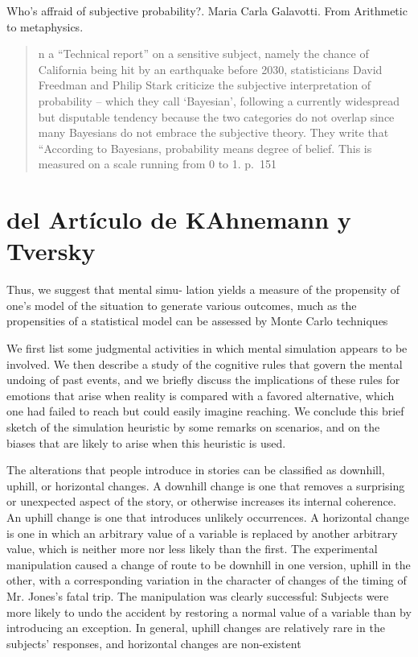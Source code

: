 

\Large{Who's affraid of subjective probability?. Maria Carla Galavotti. From Arithmetic to metaphysics.}

\begin{quote}
	n a “Technical report” on a sensitive subject, namely the chance of California being hit by an earthquake before 2030, statisticians David Freedman and Philip Stark criticize the subjective interpretation of probability – which they call ‘Bayesian’, following a currently widespread but disputable tendency because the two categories do not overlap since many Bayesians do not embrace the subjective theory. They write that “According to Bayesians, probability means degree of belief. This is measured on a scale running from 0 to 1. p.~151
\end{quote}

\section{del Artículo de KAhnemann y Tversky}

Thus, we suggest that mental simu-
lation yields a measure of the propensity of one's model of the situation to
generate various outcomes, much as the propensities of a statistical model
can be assessed by Monte Carlo techniques

We first list
some judgmental activities in which mental simulation appears to be
involved. We then describe a study of the cognitive rules that govern the
mental undoing of past events, and we briefly discuss the implications of
these rules for emotions that arise when reality is compared with a favored
alternative, which one had failed to reach but could easily imagine
reaching. We conclude this brief sketch of the simulation heuristic by
some remarks on scenarios, and on the biases that are likely to arise when
this heuristic is used.

The alterations that people introduce in stories can be classified as
downhill, uphill, or horizontal changes. A downhill change is one that
removes a surprising or unexpected aspect of the story, or otherwise
increases its internal coherence. An uphill change is one that introduces
unlikely occurrences. A horizontal change is one in which an arbitrary
value of a variable is replaced by another arbitrary value, which is neither
more nor less likely than the first. The experimental manipulation caused
a change of route to be downhill in one version, uphill in the other, with a
corresponding variation in the character of changes of the timing of Mr.
Jones's fatal trip. The manipulation was clearly successful: Subjects were
more likely to undo the accident by restoring a normal value of a variable
than by introducing an exception. In general, uphill changes are relatively
rare in the subjects' responses, and horizontal changes are non-existent



